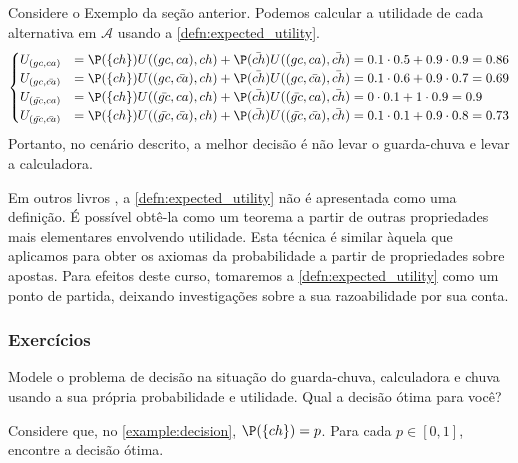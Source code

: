 \begin{example}
 \label{example:decision}
 Considere o Exemplo da seção anterior.
 Podemos calcular a utilidade de cada
 alternativa em $\mathcal{A}$
 usando a \cref{defn:expected_utility}.
 \begin{align*}
  \begin{cases}
   U_{(gc,ca)} &= \P(\{ch\})U((gc,ca), ch) + \P(\bar{ch})U((gc,ca), \bar{ch}) = 0.1 \cdot 0.5 + 0.9 \cdot 0.9 = 0.86 \\
   U_{(gc,\bar{ca})} &= \P(\{ch\})U((gc,\bar{ca}), ch) + \P(\bar{ch})U((gc,\bar{ca}), \bar{ch}) = 0.1 \cdot 0.6 + 0.9 \cdot 0.7 = 0.69 \\
   U_{(\bar{gc},ca)} &= \P(\{ch\})U((\bar{gc},ca), ch) + \P(\bar{ch})U((\bar{gc},ca), \bar{ch}) = 0 \cdot 0.1 + 1 \cdot 0.9 = 0.9 \\
   U_{(\bar{gc},\bar{ca})}	&= \P(\{ch\})U((\bar{gc},\bar{ca}), ch) + \P(\bar{ch})U((\bar{gc},\bar{ca}), \bar{ch}) = 0.1 \cdot 0.1 + 0.9 \cdot 0.8 = 0.73
  \end{cases}
 \end{align*}
 Portanto, no cenário descrito, a melhor decisão é
 não levar o guarda-chuva e levar a calculadora. 
\end{example}

Em outros livros \citep{deGroot2005}, 
a \cref{defn:expected_utility} não é apresentada como
uma definição.
É possível obtê-la como um teorema a partir de
outras propriedades
mais elementares envolvendo utilidade.
Esta técnica é similar àquela que aplicamos para
obter os axiomas da probabilidade a partir de 
propriedades sobre apostas.
Para efeitos deste curso, tomaremos a \cref{defn:expected_utility}
como um ponto de partida,
deixando investigações sobre a
sua razoabilidade por sua conta.

\subsubsection*{Exercícios}

\begin{exercise}
 Modele o problema de decisão na
 situação do guarda-chuva, calculadora e chuva
 usando a sua própria probabilidade e utilidade.
 Qual a decisão ótima para você?
\end{exercise}

\begin{exercise}
 \label{ex:umbrella}
 Considere que, no \cref{example:decision}, 
 $\P(\{ch\})=p$.
 Para cada $p \in [0,1]$,
 encontre a decisão ótima.
\end{exercise}


